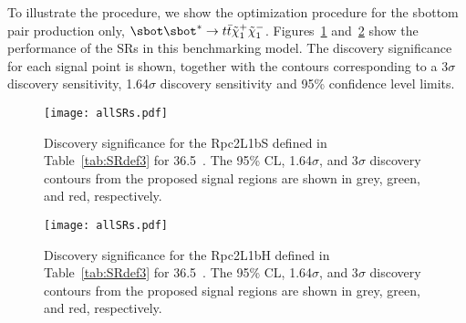 To illustrate the procedure, we show the optimization procedure for the sbottom pair production only, 
$\sbot\sbot^*\to t\bar t\tilde\chi_1^+\tilde\chi_1^-$.
Figures~\ref{fig:SR_withB.S} and~\ref{fig:SR_withB.H} show the performance of the SRs in this benchmarking model. 
The discovery significance for each signal point is shown, together with the contours corresponding to a 3$\sigma$ discovery sensitivity, 1.64$\sigma$ discovery sensitivity and 95\% confidence level limits. 

\begin{figure}  
\centering
\texttt{[image: allSRs.pdf]}  
\caption{Discovery significance for the Rpc2L1bS defined in 
Table~\ref{tab:SRdef3} for 36.5~\ifb.
The 95\% CL, 
1.64$\sigma$, and 3$\sigma$ discovery contours from the proposed signal 
regions are shown in grey, green, and red, respectively. 
 }
 \label{fig:SR_withB.S}
 \end{figure}


\begin{figure}  
\centering
\texttt{[image: allSRs.pdf]}  
\caption{Discovery significance for the Rpc2L1bH defined in 
Table~\ref{tab:SRdef3} for 36.5~\ifb.
The 95\% CL, 
1.64$\sigma$, and 3$\sigma$ discovery contours from the proposed signal 
regions are shown in grey, green, and red, respectively. 
 }
 \label{fig:SR_withB.H}
 \end{figure}




